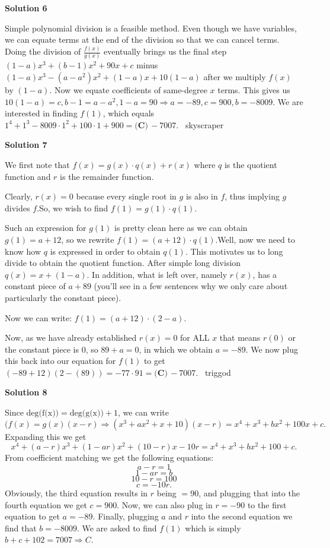 \begin{enumerate}
 



\textbf{Solution 6}

Simple polynomial division is a feasible method. Even though we have variables, we can equate terms at the end of the division so that we can cancel terms. Doing the division of $\frac{f(x)}{g(x)}$ eventually brings us the final step $(1-a)x^3 + (b-1)x^2 + 90x + c$ minus $(1-a)x^3 - (a-a^2)x^2 + (1-a)x + 10(1-a)$ after we multiply $f(x)$ by $(1-a)$. Now we equate coefficients of same-degree $x$ terms. This gives us $10(1-a) = c, b-1 = a - a^2, 1-a = 90 \Rightarrow a = -89, c = 900, b = -8009$. We are interested in finding $f(1)$, which equals $1^4 + 1^3 -8009\cdot1^2 + 100\cdot1 + 900 = \boxed{\textbf{(C)}\,-7007}$. ~skyscraper

 



\textbf{Solution 7}

We first note that $f(x) = g(x) \cdot q(x) + r(x)$ where $q$ is the quotient function and $r$ is the remainder function.

 Clearly, $r(x) = 0$ because every single root in $g$ is also in $f$, thus implying $g$ divides $f$.So, we wish to find $f(1) = g(1) \cdot q(1)$.

 Such an expression for $g(1)$ is pretty clean here as we can obtain $g(1) = a + 12$, so we rewrite $f(1) = (a + 12) \cdot q(1)$.Well, now we need to know how $q$ is expressed in order to obtain $q(1)$. This motivates us to long divide to obtain the quotient function. After simple long division $q(x) = x + (1 - a)$. In addition, what is left over, namely $r(x)$, has a constant piece of $a + 89$ (you'll see in a few sentences why we only care about particularly the constant piece).

 Now we can write: $f(1) = (a + 12) \cdot (2 - a)$.

 Now, as we have already established $r(x) = 0$ for ALL $x$ that means $r(0)$ or the constant piece is $0$, so $89 + a = 0$, in which we obtain $a = -89$. We now plug this back into our equation for $f(1)$ to get $(-89 + 12)(2 - (89)) = -77 \cdot 91 = \boxed{\textbf{(C)}\,-7007}$. ~triggod

 



\textbf{Solution 8}

Since $\text{deg(f(x))}=\text{deg(g(x))}+1$, we can write
 \[(f(x)=g(x)\left(x-r \right) \Longrightarrow \left(x^3+ax^2+x+10 \right) \left(x-r \right)=x^4+x^3+bx^2+100x+c.\]Expanding this we get
 \[x^4+\left(a-r \right)x^3+\left(1-ar \right)x^2+\left(10-r \right)x-10r=x^4+x^3+bx^2+100+c.\]From coefficient matching we get the following equations:
 \[a-r=1\]
 \[1-ar=b\]
 \[10-r=100\]
 \[c=-10r.\]Obviously, the third equation results in $r$ being $=90$, and plugging that into the fourth equation we get $c=900$. Now, we can also plug in $r=-90$ to the first equation to get $a=-89$. Finally, plugging $a$ and $r$ into the second equation we find that $b=-8009$. We are asked to find $f(1)$ which is simply $b+c+102 = 7007 \Longrightarrow \boxed{C}$.


\end{enumerate}
